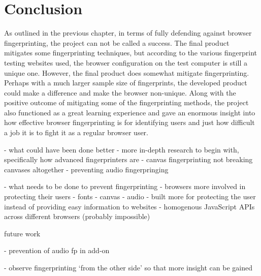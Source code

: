\chapter{Conclusion}

As outlined in the previous chapter, in terms of fully defending against browser fingerprinting, the project can not be called a success.
The final product mitigates some fingerprinting techniques, but according to the various fingerprint testing websites used, the browser configuration on the test computer is still a unique one.
However, the final product does somewhat mitigate fingerprinting.
Perhaps with a much larger sample size of fingerprints, the developed product could make a difference and make the browser non-unique.
Along with the positive outcome of mitigating some of the fingerprinting methods, the project also functioned as a great learning experience and gave an enormous insight into how effective browser fingerprinting is for identifying users and just how difficult a job it is to fight it as a regular browser user.

- what could have been done better
  - more in-depth research to begin with, specifically how advanced fingerprinters are
  - canvas fingerprinting not breaking canvases altogether
  - preventing audio fingerpringing

- what needs to be done to prevent fingerprinting
  - browsers more involved in protecting their users
    - fonts
    - canvas
    - audio
    - built more for protecting the user instead of providing easy information to websites
  - homogenous JavaScript APIs across different browsers (probably impossible)

future work

- prevention of audio fp in add-on

- observe fingerprinting `from the other side' so that more insight can be gained

